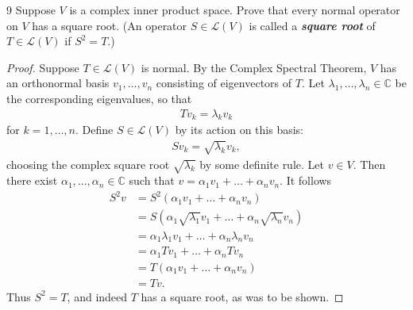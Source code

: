 \documentclass{extarticle}
\newenvironment{problem}[1]{\begin{prob*}{#1}{}}{\end{prob*}}
\newcommand{\C}{\mathbb{C}}
\newcommand{\Hom}{\mathcal{L}}
\begin{document}
\begin{problem}{9}
Suppose $V$ is a complex inner product space.  Prove that every normal operator on $V$ has a square root.  (An operator $S\in\Hom(V)$ is called a \textbf{\textit{square root}} of $T\in\Hom(V)$ if $S^2 = T$.)
\end{problem}
\begin{proof}
Suppose $T\in\Hom(V)$ is normal.  By the Complex Spectral Theorem, $V$ has an orthonormal basis $v_1,\dots, v_n$ consisting of eigenvectors of $T$.  Let $\lambda_1,\dots, \lambda_n\in\C$ be the corresponding eigenvalues, so that
\begin{align*}
Tv_k = \lambda_k v_k
\end{align*}
for $k = 1,\dots, n$.  Define $S\in\Hom(V)$ by its action on this basis:
\begin{align*}
Sv_k = \sqrt{\lambda_k}v_k,
\end{align*}
choosing the complex square root $\sqrt{\lambda_k}$ by some definite rule.  Let $v\in V$.  Then there exist $\alpha_1,\dots, \alpha_n\in\C$ such that $v = \alpha_1v_1 + \dots + \alpha_nv_n$.  It follows
\begin{align*}
S^2 v &= S^2( \alpha_1v_1 + \dots + \alpha_nv_n)\\
&= S\left(\alpha_1\sqrt{\lambda_1}v_1 + \dots + \alpha_n\sqrt{\lambda_n}v_n\right)\\
&= \alpha_1\lambda_1v_1 + \dots + \alpha_n\lambda_n v_n\\
&= \alpha_1Tv_1 + \dots + \alpha_nTv_n\\
&= T( \alpha_1v_1 + \dots + \alpha_nv_n)\\
&= Tv.
\end{align*}
Thus $S^2 = T$, and indeed $T$ has a square root, as was to be shown.
\end{proof}
\end{document}
